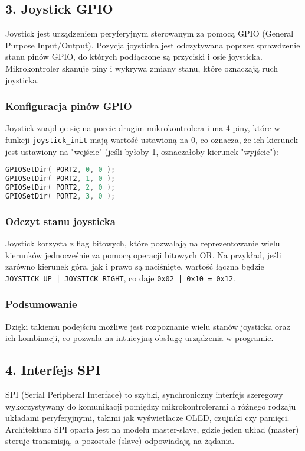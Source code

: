 \documentclass[a4paper,12pt]{report}
\begin{document}
\subsection*{3. Joystick GPIO}

Joystick jest urządzeniem peryferyjnym sterowanym za pomocą GPIO (General Purpose Input/Output). Pozycja joysticka jest odczytywana poprzez sprawdzenie stanu pinów GPIO, do których podłączone są przyciski i osie joysticka. Mikrokontroler skanuje piny i wykrywa zmiany stanu, które oznaczają ruch joysticka.

\subsubsection*{Konfiguracja pinów GPIO}

Joystick znajduje się na porcie drugim mikrokontrolera i ma 4 piny, które w funkcji \texttt{joystick\_init} mają wartość ustawioną na 0, co oznacza, że ich kierunek jest ustawiony na "wejście" (jeśli byłoby 1, oznaczałoby kierunek "wyjście"):
\begin{lstlisting}[language=C]
GPIOSetDir( PORT2, 0, 0 );
GPIOSetDir( PORT2, 1, 0 );
GPIOSetDir( PORT2, 2, 0 );
GPIOSetDir( PORT2, 3, 0 );
\end{lstlisting}

\subsubsection*{Odczyt stanu joysticka}

Joystick korzysta z flag bitowych, które pozwalają na reprezentowanie wielu kierunków jednocześnie za pomocą operacji bitowych OR. Na przykład, jeśli zarówno kierunek góra, jak i prawo są naciśnięte, wartość łączna będzie \texttt{JOYSTICK\_UP | JOYSTICK\_RIGHT}, co daje \texttt{0x02 | 0x10 = 0x12}.

\subsubsection*{Podsumowanie}

Dzięki takiemu podejściu możliwe jest rozpoznanie wielu stanów joysticka oraz ich kombinacji, co pozwala na intuicyjną obsługę urządzenia w programie.

\subsection*{4. Interfejs SPI}

SPI (Serial Peripheral Interface) to szybki, synchroniczny interfejs szeregowy wykorzystywany do komunikacji pomiędzy mikrokontrolerami a różnego rodzaju układami peryferyjnymi, takimi jak wyświetlacze OLED, czujniki czy pamięci. Architektura SPI oparta jest na modelu master-slave, gdzie jeden układ (master) steruje transmisją, a pozostałe (slave) odpowiadają na żądania.
\end{document}
